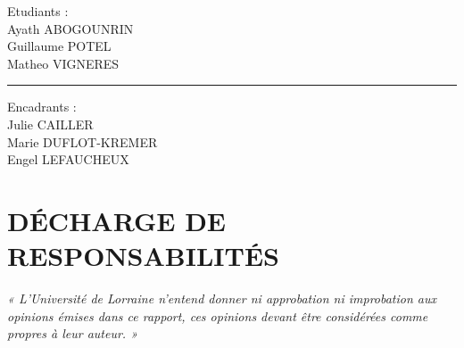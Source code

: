 \documentclass[11pt]{article}
\begin{document}
\begin{titlepage}
    \begin{minipage}[t]{0.45\textwidth}
        \begin{flushleft}
            \small Etudiants : \\
            \hspace*{1.5em} Ayath ABOGOUNRIN \\
            \hspace*{1.5em} Guillaume POTEL \\
            \hspace*{1.5em} Matheo VIGNERES
        \end{flushleft}
    \end{minipage}%
    \begin{minipage}[t]{0.1\textwidth}
        \vspace*{0.5em} %
        \centering
        \rule{1pt}{\baselineskip + 0.5em} %
    \end{minipage}%
    \begin{minipage}[t]{0.45\textwidth}
        \begin{flushright}
            \small Encadrants : \\
            \hspace*{0pt}\llap{\hspace*{1.5em}} Julie CAILLER \\
            \hspace*{0pt}\llap{\hspace*{1.5em}} Marie DUFLOT-KREMER \\
            \hspace*{0pt}\llap{\hspace*{1.5em}} Engel LEFAUCHEUX
        \end{flushright}
    \end{minipage}

\end{titlepage}


\newpage %
\null %

\newpage
\section*{DÉCHARGE DE RESPONSABILITÉS}
\vspace*{\fill}
\textit{« L’Université de Lorraine n’entend donner ni approbation ni improbation aux opinions émises dans ce
rapport, ces opinions devant être considérées comme propres à leur auteur. »}
\vspace*{\fill}
\end{document}
